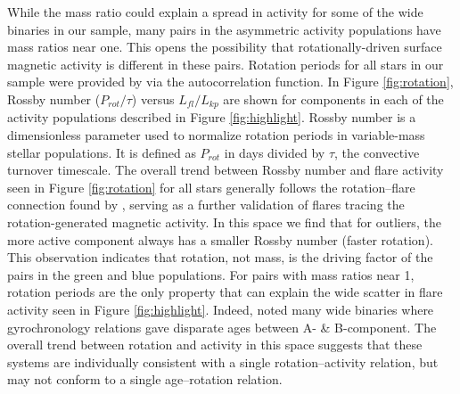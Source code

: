\documentclass[preprint2]{aastex61}
\begin{document}
While the mass ratio could explain a spread in activity for some of the wide binaries in our sample, many pairs in the asymmetric activity populations have mass ratios near one. This opens the possibility that rotationally-driven surface magnetic activity is different in these pairs. Rotation periods for all stars in our sample were provided by \citet{janes2017} via the autocorrelation function. In Figure \ref{fig:rotation}, Rossby number ($P_{rot}/\tau$) versus $L_{fl}/L_{kp}$ are shown for components in each of the activity populations described in Figure \ref{fig:highlight}. Rossby number is a dimensionless parameter used to normalize rotation periods in variable-mass stellar populations. It is defined as $P_{rot}$ in days divided by $\tau$, the convective turnover timescale. The overall trend between Rossby number and flare activity seen in Figure \ref{fig:rotation} for all stars generally follows the rotation--flare connection found by \citet{davenport2016}, serving as a further validation of flares tracing the rotation-generated magnetic activity. In this space we find that for outliers, the more active component always has a smaller Rossby number (faster rotation). This observation indicates that rotation, not mass, is the driving factor of the pairs in the green and blue populations. For pairs with mass ratios near 1, rotation periods are the only property that can explain the wide scatter in flare activity seen in Figure \ref{fig:highlight}. Indeed, \citet{janes2017} noted many wide binaries where gyrochronology relations gave disparate ages between A- \& B-component. The overall trend between rotation and activity in this space suggests that these systems are individually consistent with a single rotation--activity relation, but may not conform to a single age--rotation relation.
\end{document}
